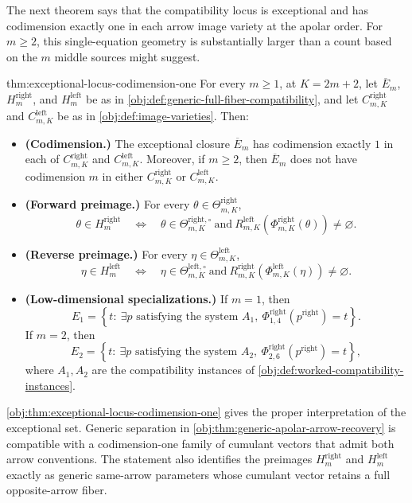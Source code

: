 The next theorem says that the compatibility locus is exceptional and has codimension exactly one in each arrow image variety at the apolar order. For \(m\ge2\), this single-equation geometry is substantially larger than a count based on the \(m\) middle sources might suggest.

\begin{theoremv}{thm:exceptional-locus-codimension-one}
For every \(m\geq 1\), at \(K=2m+2\), let \(\overline E_m\), \(H^{\mathrm{right}}_m\), and \(H^{\mathrm{left}}_m\) be as in \cref{obj:def:generic-full-fiber-compatibility}, and let \(C^{\mathrm{right}}_{m,K}\) and \(C^{\mathrm{left}}_{m,K}\) be as in \cref{obj:def:image-varieties}. Then:
\begin{itemize}
\item \textbf{(Codimension.)} The exceptional closure \(\overline E_m\) has codimension exactly \(1\) in each of \(C^{\mathrm{right}}_{m,K}\) and \(C^{\mathrm{left}}_{m,K}\). Moreover, if \(m\geq 2\), then \(\overline E_m\) does not have codimension \(m\) in either \(C^{\mathrm{right}}_{m,K}\) or \(C^{\mathrm{left}}_{m,K}\).

\item \textbf{(Forward preimage.)} For every \(\theta\in\Theta^{\mathrm{right}}_{m,K}\),
\[
\theta\in H^{\mathrm{right}}_m
\quad\Longleftrightarrow\quad
\theta\in\Theta^{\mathrm{right},\circ}_{m,K}
\ \text{and}\
R^{\mathrm{left}}_{m,K}\!\left(\Phi^{\mathrm{right}}_{m,K}(\theta)\right)\neq\varnothing .
\]

\item \textbf{(Reverse preimage.)} For every \(\eta\in\Theta^{\mathrm{left}}_{m,K}\),
\[
\eta\in H^{\mathrm{left}}_m
\quad\Longleftrightarrow\quad
\eta\in\Theta^{\mathrm{left},\circ}_{m,K}
\ \text{and}\
R^{\mathrm{right}}_{m,K}\!\left(\Phi^{\mathrm{left}}_{m,K}(\eta)\right)\neq\varnothing .
\]

\item \textbf{(Low-dimensional specializations.)} If \(m=1\), then
\[
E_1
=
\left\{
t:\ \exists p\text{ satisfying the system }A_1,\ 
\Phi^{\mathrm{right}}_{1,4}(p^{\mathrm{right}})=t
\right\}.
\]
If \(m=2\), then
\[
E_2
=
\left\{
t:\ \exists p\text{ satisfying the system }A_2,\ 
\Phi^{\mathrm{right}}_{2,6}(p^{\mathrm{right}})=t
\right\},
\]
where \(A_1,A_2\) are the compatibility instances of \cref{obj:def:worked-compatibility-instances}.
\end{itemize}
\end{theoremv}

\cref{obj:thm:exceptional-locus-codimension-one} gives the proper interpretation of the exceptional set. Generic separation in \cref{obj:thm:generic-apolar-arrow-recovery} is compatible with a codimension-one family of cumulant vectors that admit both arrow conventions. The statement also identifies the preimages \(H^{\mathrm{right}}_m\) and \(H^{\mathrm{left}}_m\) exactly as generic same-arrow parameters whose cumulant vector retains a full opposite-arrow fiber.

